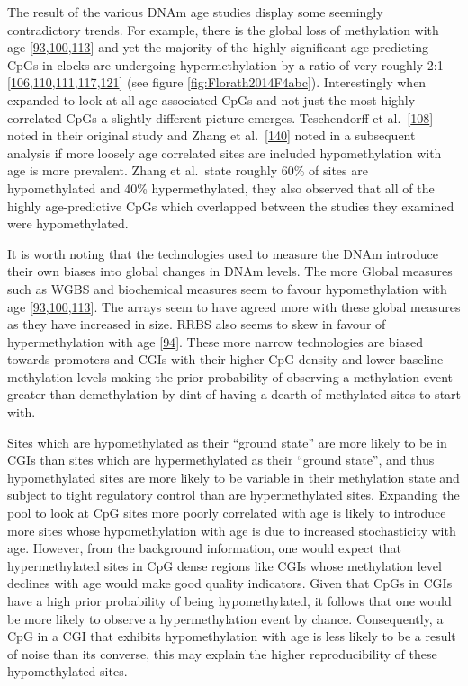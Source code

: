 \documentclass[
]{book}
\begin{document}
The result of the various DNAm age studies display some seemingly contradictory trends.
For example, there is the global loss of methylation with age {[}\protect\hyperlink{ref-Wilson1987}{93},\protect\hyperlink{ref-Fraga2005}{100},\protect\hyperlink{ref-Heyn2012}{113}{]} and yet the majority of the highly significant age predicting CpGs in clocks are undergoing hypermethylation by a ratio of very roughly 2:1 {[}\protect\hyperlink{ref-Rakyan2010}{106},\protect\hyperlink{ref-Bocklandt2011}{110},\protect\hyperlink{ref-Koch2011}{111},\protect\hyperlink{ref-Garagnani2012}{117},\protect\hyperlink{ref-Florath2014}{121}{]} (see figure \ref{fig:Florath2014F4abc}).
Interestingly when expanded to look at all age-associated CpGs and not just the most highly correlated CpGs a slightly different picture emerges. Teschendorff et al.~{[}\protect\hyperlink{ref-Teschendorff2010}{108}{]} noted in their original study and Zhang et al.~{[}\protect\hyperlink{ref-Zhang2017}{140}{]} noted in a subsequent analysis if more loosely age correlated sites are included hypomethylation with age is more prevalent.
Zhang et al.~state roughly 60\% of sites are hypomethylated and 40\% hypermethylated, they also observed that all of the highly age-predictive CpGs which overlapped between the studies they examined were hypomethylated.

It is worth noting that the technologies used to measure the DNAm introduce their own biases into global changes in DNAm levels.
The more Global measures such as WGBS and biochemical measures seem to favour hypomethylation with age {[}\protect\hyperlink{ref-Wilson1987}{93},\protect\hyperlink{ref-Fraga2005}{100},\protect\hyperlink{ref-Heyn2012}{113}{]}.
The arrays seem to have agreed more with these global measures as they have increased in size.
RRBS also seems to skew in favour of hypermethylation with age {[}\protect\hyperlink{ref-Cole2017}{94}{]}.
These more narrow technologies are biased towards promoters and CGIs with their higher CpG density and lower baseline methylation levels making the prior probability of observing a methylation event greater than demethylation by dint of having a dearth of methylated sites to start with.

Sites which are hypomethylated as their ``ground state'' are more likely to be in CGIs than sites which are hypermethylated as their ``ground state'', and thus hypomethylated sites are more likely to be variable in their methylation state and subject to tight regulatory control than are hypermethylated sites.
Expanding the pool to look at CpG sites more poorly correlated with age is likely to introduce more sites whose hypomethylation with age is due to increased stochasticity with age.
However, from the background information, one would expect that hypermethylated sites in CpG dense regions like CGIs whose methylation level declines with age would make good quality indicators.
Given that CpGs in CGIs have a high prior probability of being hypomethylated, it follows that one would be more likely to observe a hypermethylation event by chance.
Consequently, a CpG in a CGI that exhibits hypomethylation with age is less likely to be a result of noise than its converse, this may explain the higher reproducibility of these hypomethylated sites.
\end{document}
